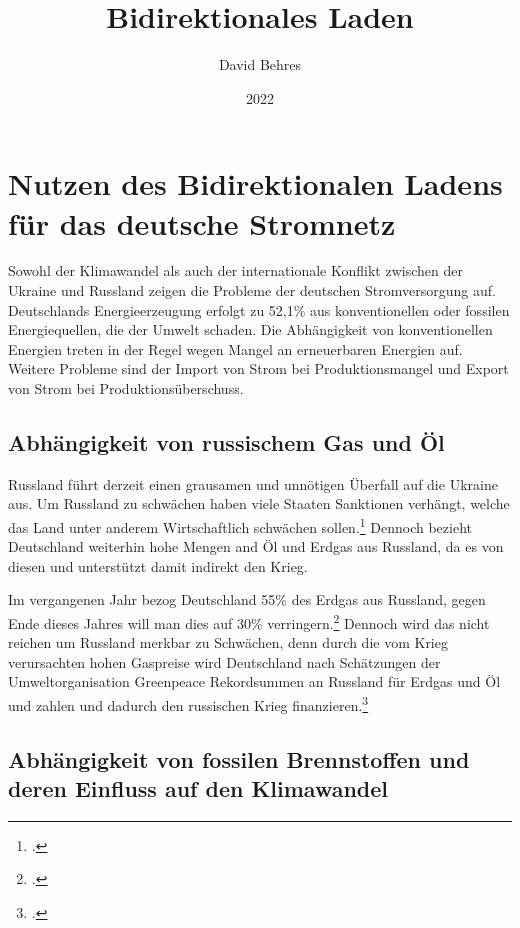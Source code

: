 \documentclass[12pt]{article}
\title{Bidirektionales Laden}
\author{David Behres}
\date{2022}
\begin{document}
    \tableofcontents
    \pagebreak


    \section{Nutzen des Bidirektionalen Ladens für das deutsche Stromnetz}
    Sowohl der Klimawandel als auch der internationale Konflikt zwischen der Ukraine und Russland
    zeigen die Probleme der deutschen Stromversorgung auf.
    Deutschlands Energieerzeugung erfolgt zu 52,1\% aus konventionellen oder fossilen Energiequellen, die der Umwelt
    schaden.
    Die Abhängigkeit von konventionellen Energien treten in der Regel wegen Mangel an erneuerbaren Energien auf.
    Weitere Probleme sind der Import von Strom bei Produktionsmangel und Export von Strom bei Produktionsüberschuss.

    \subsection{Abhängigkeit von russischem Gas und Öl} \label{subsec:putin}
    Russland führt derzeit einen grausamen und unnötigen Überfall auf die Ukraine aus.
    Um Russland zu schwächen haben viele Staaten Sanktionen verhängt, welche das Land unter anderem
    Wirtschaftlich schwächen sollen.\footcite{SanktionenGegenRussland2022}
    Dennoch bezieht Deutschland weiterhin hohe Mengen and Öl und Erdgas aus Russland, da es von diesen und
    unterstützt damit indirekt den Krieg.

    Im vergangenen Jahr bezog Deutschland 55\% des Erdgas aus Russland, gegen Ende dieses Jahres will man dies auf
    30\% verringern.\footcite{wdraktuellFAQWasGasLieferstopp} Dennoch wird das nicht reichen um Russland merkbar zu
    Schwächen, denn durch die vom Krieg verursachten hohen Gaspreise wird Deutschland nach Schätzungen der
    Umweltorganisation Greenpeace Rekordsummen an Russland für Erdgas und Öl und zahlen und dadurch den russischen
    Krieg finanzieren.\footcite{balserOlUndGas}



    \subsection{Abhängigkeit von fossilen Brennstoffen und deren Einfluss auf den Klimawandel}
\end{document}
